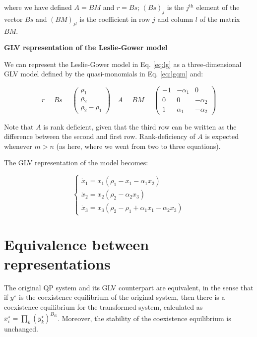 \documentclass{article}
\begin{document}
where we have defined \(A = BM\) and \(r = B s\); \((Bs)_j\) is the
\(j^{\text{th}}\) element of the vector \(Bs\) and \((B M)_{jl}\) is the
coefficient in row \(j\) and column \(l\) of the matrix \(BM\).

\begin{cb}
\textbf{GLV representation of the Leslie-Gower model}

We can represent the Leslie-Gower model in Eq. \ref{eq:lg} as a three-dimensional GLV model defined by the quasi-monomials in Eq. \ref{eq:lgqm} and:

\begin{equation}
r = B s = \begin{pmatrix}
\rho_1\\
\rho_2\\
\rho_2 - \rho_1
\end{pmatrix}
\quad
A = B M = \begin{pmatrix}
-1 & -\alpha_1 & 0\\
0 & 0 & -\alpha_2\\
1 & \alpha_1 & -\alpha_2
\end{pmatrix}
\end{equation}

Note that $A$ is rank deficient, given that the third row can be written as the difference between the second and first row. Rank-deficiency of $A$ is expected whenever $m > n$ (as here, where we went from two to three equations).

The GLV representation of the model becomes:

\begin{equation}
\label{eq:lgglv}
\begin{cases}
\dot{x}_1 = x_1 (\rho_1 - x_1 - \alpha_1 x_2)\\
\dot{x}_2 = x_2 (\rho_2 - \alpha_2 x_3)\\
\dot{x}_3 = x_3 (\rho_2 - \rho_1 + \alpha_1 x_1 - \alpha_2 x_3)
\end{cases}
\end{equation}

\end{cb}

\hypertarget{equivalence-between-representations}{%
\section{Equivalence between
representations}\label{equivalence-between-representations}}

The original QP system and its GLV counterpart are equivalent, in the
sense that if \(y^\star\) is the coexistence equilibrium of the original
system, then there is a coexistence equilibrium for the transformed
system, calculated as \(x_i^\star = \prod_{k} (y_k^\star)^{B_{ik}}\).
Moreover, the stability of the coexistence equilibrium is unchanged.
\end{document}
